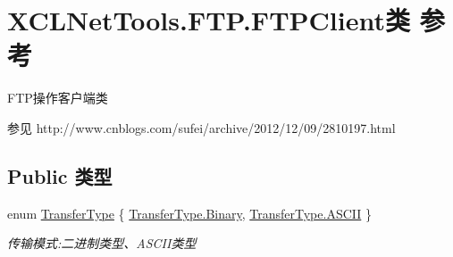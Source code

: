 \hypertarget{class_x_c_l_net_tools_1_1_f_t_p_1_1_f_t_p_client}{}\section{X\+C\+L\+Net\+Tools.\+F\+T\+P.\+F\+T\+P\+Client类 参考}
\label{class_x_c_l_net_tools_1_1_f_t_p_1_1_f_t_p_client}


F\+T\+P操作客户端类 \begin{DoxySeeAlso}{参见}
http\+://www.\+cnblogs.\+com/sufei/archive/2012/12/09/2810197.\+html


\end{DoxySeeAlso}
 


\subsection*{Public 类型}
\begin{DoxyCompactItemize}
\item 
enum \hyperlink{class_x_c_l_net_tools_1_1_f_t_p_1_1_f_t_p_client_adef28404af1c916d9bd2bfbfa924b707}{Transfer\+Type} \{ \hyperlink{class_x_c_l_net_tools_1_1_f_t_p_1_1_f_t_p_client_adef28404af1c916d9bd2bfbfa924b707a6ce976e8f061b2b5cfe4d0c50c3405dd}{Transfer\+Type.\+Binary}, 
\hyperlink{class_x_c_l_net_tools_1_1_f_t_p_1_1_f_t_p_client_adef28404af1c916d9bd2bfbfa924b707ad2cd8253361a9c732d21ca1d336599cc}{Transfer\+Type.\+A\+S\+C\+II}
 \}\begin{DoxyCompactList}\small\item\em 传输模式\+:二进制类型、\+A\+S\+C\+I\+I类型 \end{DoxyCompactList}
\end{DoxyCompactItemize}
